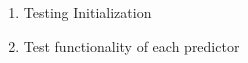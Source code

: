 \documentclass[]{report}   %
\begin{document}
\begin{enumerate}[I]
  \item{Testing Initialization}
  \item{Test functionality of each predictor}

\end{enumerate}
\end{document}
